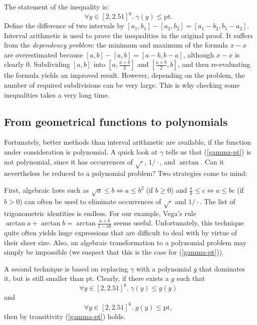 \documentclass[11pt]{amsart}
\def\sfrac#1#2{{\textstyle \frac {#1} {#2}}}
\def\eqref#1{(\ref{#1})}
\def\pt{\mathrm{pt}}
\begin{document}
The statement of the inequality is:
\begin{equation}
\forall y \in [2,2.51]^6.\; \gamma(y) \le \pt. \label{gamma-pt}
\end{equation}
Define the difference of two intervals by $[a_1,b_1]-[a_2,b_2] = [a_1-b_2,b_1-a_2]$.
Interval arithmetic is used to prove the inequalities in the original proof.
It
suffers from the \emph{dependency problem}: the minimum and maximum of the
formula $x-x$ are overestimated because $[a,b] - [a,b] = [a-b,b-a]$, although
$x-x$ is clearly $0$. Subdividing $[a,b]$ into $[a,\sfrac{a+b}2]$ and
$[\sfrac{a+b}2,b]$, and then re-evaluating the formula yields an improved
result. However, depending on the problem, the number of required subdivisions
can be very large. This is why checking some inequalities takes a very long
time.

\subsection{From geometrical functions to polynomials}
Fortunately, better methods than interval arithmetic are available, if the
function under consideration is polynomial. A quick look at $\gamma$ tells us
that \eqref{gamma-pt} is not polynomial, since it has occurrences of
$\sqrt\cdot$, $1/\cdot$, and $\arctan$. Can it nevertheless be reduced
to a polynomial problem? Two strategies come to mind:

First, algebraic laws such as $\sqrt a \le b \Leftrightarrow a \le b^2$ (if $b
\ge 0$) and $\frac a b \le c \Leftrightarrow a \le bc$ (if $b>0$) can often be
used to eliminate occurrences of $\sqrt\cdot$ and $1/\cdot$. The list of
trigonometric identities is endless. For our example, Vega's rule $\arctan a +
\arctan b = \arctan \frac {a + b} {1 - ab}$ seems useful. Unfortunately, this
technique quite often yields huge expressions that are difficult to deal with by
virtue of their sheer size. Also, an algebraic transformation to a polynomial problem may
simply be impossible (we suspect that this is the case for \eqref{gamma-pt}).

A second technique is based on replacing $\gamma$ with a polynomial $g$ that
dominates it, but is still smaller than $\pt$. Clearly, if there exists a $g$
such that
\begin{equation}
\forall y \in [2,2.51]^6.\; \gamma(y) \le g(y) \label{gamma-g}
\end{equation}
and
\begin{equation}
\forall y \in [2,2.51]^6.\; g(y) \le \pt, \label{g-pt}
\end{equation}
then by transitivity \eqref{gamma-pt} holds.
\end{document}
